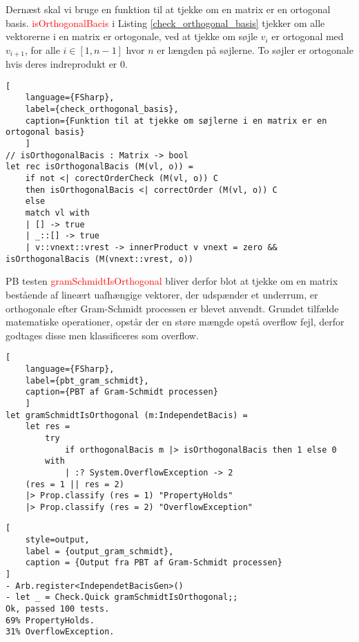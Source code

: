 Dernæst skal vi bruge en funktion til at tjekke om en matrix er en ortogonal basis. \textcolor{red}{isOrthogonalBacis} i Listing \ref{check_orthogonal_basis} tjekker om alle vektorerne i en matrix er ortogonale, ved at tjekke om søjle $v_i$ er ortogonal med $v_{i+1}$, for alle $i \in [1, n-1]$ hvor $n$ er længden på søjlerne. To søjler er ortogonale hvis deres indreprodukt er 0.

\begin{lstlisting}[
    language={FSharp}, 
    label={check_orthogonal_basis}, 
    caption={Funktion til at tjekke om søjlerne i en matrix er en ortogonal basis}
    ]
// isOrthogonalBacis : Matrix -> bool
let rec isOrthogonalBacis (M(vl, o)) =
    if not <| corectOrderCheck (M(vl, o)) C 
    then isOrthogonalBacis <| correctOrder (M(vl, o)) C
    else
    match vl with
    | [] -> true
    | _::[] -> true
    | v::vnext::vrest -> innerProduct v vnext = zero && isOrthogonalBacis (M(vnext::vrest, o))
\end{lstlisting}

PB testen \textcolor{red}{gramSchmidtIsOrthogonal} bliver derfor blot at tjekke om en matrix bestående af lineært uafhængige vektorer, der udspænder et underrum, er orthogonale efter Gram-Schmidt processen er blevet anvendt. Grundet tilfælde matematiske operationer, opstår der en støre mængde opstå overflow fejl, derfor godtages disse men klassificeres som overflow.

\begin{lstlisting}[
    language={FSharp}, 
    label={pbt_gram_schmidt}, 
    caption={PBT af Gram-Schmidt processen}
    ]
let gramSchmidtIsOrthogonal (m:IndependetBacis) =
    let res =
        try 
            if orthogonalBacis m |> isOrthogonalBacis then 1 else 0
        with
            | :? System.OverflowException -> 2
    (res = 1 || res = 2)
    |> Prop.classify (res = 1) "PropertyHolds"
    |> Prop.classify (res = 2) "OverflowException"
\end{lstlisting}

\begin{lstlisting}[
    style=output,
    label = {output_gram_schmidt},
    caption = {Output fra PBT af Gram-Schmidt processen}
]
- Arb.register<IndependetBacisGen>()
- let _ = Check.Quick gramSchmidtIsOrthogonal;;
Ok, passed 100 tests.
69% PropertyHolds.
31% OverflowException.
\end{lstlisting}

